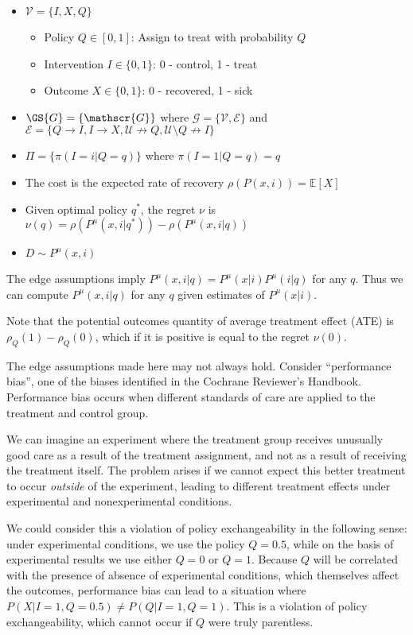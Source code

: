 \begin{itemize}
    \item $\mathcal{V}=\{I,X,Q\}$
    \begin{itemize}
        \item Policy $Q\in[0,1]$: Assign to treat with probability $Q$
        \item Intervention $I\in\{0,1\}$: 0 - control, 1 - treat
        \item Outcome $X\in\{0,1\}$: 0 - recovered, 1 - sick
\end{itemize}
    \item $\GS{G}=\{\mathscr{G}\}$ where $\mathscr{G}=\{\mathcal{V},\mathscr{E}\}$ and $\mathscr{E}=\{Q\to I, I\to X, \mathcal{U}\not\to Q, \mathcal{U}\setminus Q\not\to I\}$
    \item $\Pi=\{\pi(I=i|Q=q)\}$ where $\pi(I=1|Q=q)=q$
    \item The cost is the expected rate of recovery $\rho(P(x,i)) = \mathbb{E}[X]$
    \item Given optimal policy $q^*$, the regret $\nu$ is $\nu(q)=\rho(P^\mu (x,i|q^*)) - \rho(P^\mu(x,i|q))$
    \item $D\sim P^\mu(x,i)$
\end{itemize}

The edge assumptions imply $P^\mu(x,i|q) = P^\mu(x|i)P^\mu(i|q)$ for any $q$. Thus we can compute $P^\mu(x,i|q)$ for any $q$ given estimates of $P^\mu(x|i)$.

Note that the potential outcomes quantity of average treatment effect (ATE) is $\rho_Q(1)-\rho_Q(0)$, which if it is positive is equal to the regret $\nu(0)$.

The edge assumptions made here may not always hold. Consider ``performance bias'', one of the biases identified in the Cochrane Reviewer's Handbook\cite{collaboration_cochrane_nodate}. Performance bias occurs when different standards of care are applied to the treatment and control group. 

We can imagine an experiment where the treatment group receives unusually good care as a result of the treatment assignment, and not as a result of receiving the treatment itself. The problem arises if we cannot expect this better treatment to occur \emph{outside} of the experiment, leading to different treatment effects under experimental and nonexperimental conditions.

We could consider this a violation of policy exchangeability in the following sense: under experimental conditions, we use the policy $Q=0.5$, while on the basis of experimental results we use either $Q=0$ or $Q=1$. Because $Q$ will be correlated with the presence of absence of experimental conditions, which themselves affect the outcomes, performance bias can lead to a situation where $P(X|I=1,Q=0.5)\neq P(Q|I=1,Q=1)$. This is a violation of policy exchangeability, which cannot occur if $Q$ were truly parentless.

